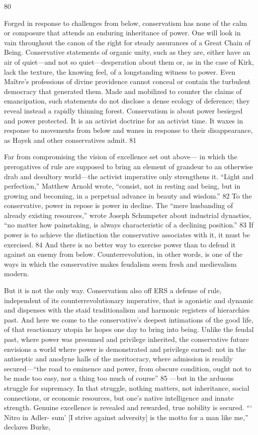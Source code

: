 {\color{blue} 80 } {\par} Forged in response to challenges from below, conservatism has none of the calm or composure that attends an enduring inheritance of power. One will look in vain throughout the canon of the right for steady assurances of a Great Chain of Being. Conservative statements of organic unity, such as they are, either have an air of quiet—and not so quiet—desperation about them or, as in the case of Kirk, lack the texture, the knowing feel, of a longstanding witness to power. Even Maître’s professions of divine providence cannot conceal or contain the turbulent democracy that generated them. Made and mobilized to counter the claims of emancipation, such statements do not disclose a dense ecology of deference; they reveal instead a rapidly thinning forest. Conservatism is about power besieged and power protected. It is an activist doctrine for an activist time. It waxes in response to movements from below and wanes in response to their disappearance, as Hayek and other conservatives admit. {\color{blue} 81 } {\par} Far from compromising the vision of excellence set out above— in which the prerogatives of rule are supposed to bring an element of grandeur to an otherwise drab and desultory world—the activist imperative only strengthens it. “Light and perfection,” Matthew Arnold wrote, “consist, not in resting and being, but in growing and becoming, in a perpetual advance in beauty and wisdom.” {\color{blue} 82 } To the conservative, power in repose is power in decline. The “mere husbanding of already existing resources,” wrote Joseph Schumpeter about industrial dynasties, “no matter how painstaking, is always characteristic of a declining position.” {\color{blue} 83 } If power is to achieve the distinction the conservative associates with it, it must be exercised. {\color{blue} 84 } And there is no better way to exercise power than to defend it against an enemy from below. Counterrevolution, in other words, is one of the ways in which the conservative makes feudalism seem fresh and medievalism modern.{\par} But it is not the only way. Conservatism also off ERS a defense of rule, independent of its counterrevolutionary imperative, that is agonistic and dynamic and dispenses with the staid traditionalism and harmonic registers of hierarchies past. And here we come to the conservative’s deepest intimations of the good life, of that reactionary utopia he hopes one day to bring into being. Unlike the feudal past, where power was presumed and privilege inherited, the conservative future envisions a world where power is demonstrated and privilege earned: not in the antiseptic and anodyne halls of the meritocracy, where admission is readily secured—“the road to eminence and power, from obscure condition, ought not to be made too easy, nor a thing too much of course” {\color{blue} 85 } —but in the arduous struggle for supremacy. In that struggle, nothing matters, not inheritance, social connections, or economic resources, but one’s native intelligence and innate strength. Genuine excellence is revealed and rewarded, true nobility is secured. “‘ Nitro in Adler- sum’ [I strive against adversity] is the motto for a man like me,” declares Burke, 